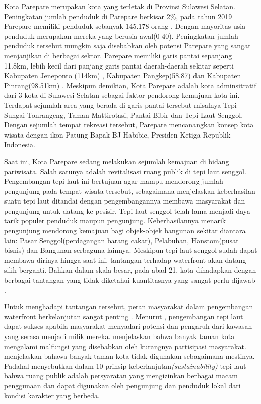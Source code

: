 \documentclass[../projects/thesis.tex]{subfiles}
\begin{document}
Kota Parepare merupakan kota yang terletak di Provinsi Sulawesi Selatan. Peningkatan jumlah penduduk di Parepare berkisar 2\%, pada tahun 2019 Parepare memiliki penduduk sebanyak 145.178 orang \citep{bpskotaparepare2020}. Dengan mayoritas usia penduduk  merupakan mereka yang berusia awal(0-40). Peningkatan jumlah penduduk tersebut mungkin saja disebabkan oleh potensi Parepare yang sangat menjanjikan di berbagai sektor.
Parepare memiliki garis pantai sepanjang 11.8km, lebih kecil dari panjang garis pantai daerah-daerah sekitar seperti Kabupaten Jeneponto (114km) \citep{wardasusaniati2011}, Kabupaten Pangkep(58.87) dan Kabupaten Pinrang(98.51km) \citep{goni2018}. Meskipun demikian, Kota Parepare adalah kota adminsitratif dari 3 kota di Sulawesi Selatan \citep{junaid2016} sebagai faktor pendorong kemajuan kota ini.
Terdapat sejumlah area yang berada di garis pantai tersebut misalnya Tepi Sungai Tonrangeng, Taman Mattirotasi, Pantai Bibir dan Tepi Laut Senggol.
Dengan sejumlah tempat rekreasi tersebut, Parepare mencanangkan konsep kota wisata dengan ikon Patung Bapak BJ Habibie, Presiden Ketiga Republik Indonesia.

Saat ini, Kota Parepare sedang melakukan sejumlah kemajuan di bidang pariwisata. Salah satunya adalah revitalisasi ruang publik di tepi laut senggol.
Pengembangan tepi laut ini bertujuan agar mampu mendorong jumlah pengunjung pada tempat wisata tersebut, sebagaimana \cite{hoyle2001} menjelaskan keberhasilan suatu tepi laut ditandai dengan pengembangannya membawa masyarakat dan pengunjung untuk datang ke pesisir.
Tepi laut senggol telah lama menjadi daya tarik populer penduduk maupun pengunjung. Keberhasilannya menarik pengunjung mendorong kemajuan bagi objek-objek bangunan sekitar diantara lain: Pasar Senggol(perdagangan barang cakar), Pelabuhan, Hanstom(pusat bisnis) dan Bangunan serbaguna lainnya.
Meskipun tepi laut senggol sudah dapat membawa dirinya hingga saat ini, tantangan terhadap waterfront akan datang silih berganti. Bahkan dalam skala besar, pada abad 21, kota dihadapkan dengan berbagai tantangan yang tidak diketahui kuantitasnya yang sangat perlu dijawab \citep{niemann2016}.

Untuk menghadapi tantangan tersebut, peran masyarakat dalam pengembangan waterfront berkelanjutan sangat penting \citep{giovinazzi2009, eldeeb2015}.
Menurut \cite{hussein2014}, pengembangan tepi laut dapat sukses apabila masyarakat menyadari potensi dan pengaruh dari kawasan yang serasa menjadi milik mereka.
\cite{devysandra2012} menjelaskan bahwa banyak taman kota mengalami malfungsi yang disebabkan oleh kurangnya partisipasi masyarakat.
\cite{devysandra2012} menjelaskan bahawa banyak taman kota tidak digunakan sebagaimana mestinya. Padahal \citep{giovinazzi2009} menyebutkan dalam 10 prinsip keberlanjutan\textit{(sustainability)} tepi laut bahwa ruang publik adalah persyaratan yang mengizinkan berbagai macam penggunaan dan dapat digunakan oleh pengunjung dan penduduk lokal dari kondisi karakter yang berbeda.
\end{document}

